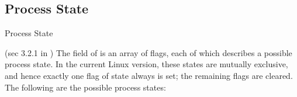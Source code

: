 \subsection{Process State}

\begin{frame}{Process State}
  \begin{center}
     
  \end{center}
\end{frame}

(sec 3.2.1 in \cite{bovet2005understanding}) The  field of 
is an array of flags, each of which describes a possible process state. In the current
Linux version, these states are mutually exclusive, and hence exactly one flag of state
always is set; the remaining flags are cleared. The following are the possible process
states:
